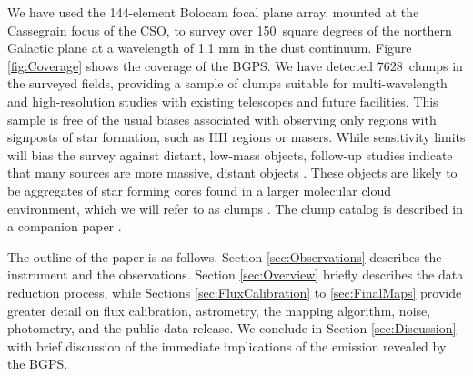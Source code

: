 \documentclass{emulateapj}
\newcommand{\lon}{\ensuremath{l}}
\newcommand\jyb{Jy~beam$^{-1}$}
\def\bgps{BGPS}
\newcommand{\bgpsarea}{150}
\newcommand{\ncores}{7628}
\begin{document}
We have used the 144-element Bolocam focal plane array, mounted at the
Cassegrain focus of the CSO, to survey over \bgpsarea\ square degrees
of the northern Galactic plane at a wavelength of 1.1 mm in the dust
continuum.  Figure \ref{fig:Coverage} shows the coverage of the \bgps.
We have detected \ncores\ clumps in the surveyed fields, providing a
sample of clumps suitable for multi-wavelength and high-resolution
studies with existing telescopes and future facilities.  This sample
is free of the usual biases associated with observing only regions
with signposts of star formation, such as HII regions or masers. While
sensitivity limits will bias the survey against distant, low-mass
objects, follow-up studies indicate that many sources are more
massive, distant objects \citep{bally09,nordhaus09, rosolowsky09}.
These objects are likely to be aggregates of star forming cores found
in a larger molecular cloud environment, which we will refer to as
clumps \citep{williams00}.  The clump catalog is described in a
companion paper \citep{rosolowsky09}.

The outline of the paper is as follows. Section \ref{sec:Observations}
describes the instrument and the observations.  Section
\ref{sec:Overview} briefly describes the data reduction process, while
Sections \ref{sec:FluxCalibration} to \ref{sec:FinalMaps} provide
greater detail on flux calibration, astrometry, the mapping algorithm,
noise, photometry, and the public data release.  We conclude in
Section \ref{sec:Discussion} with brief discussion of the immediate
implications of the emission revealed by the BGPS.




%
%
\end{document}
